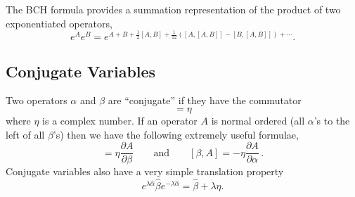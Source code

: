 The BCH formula provides a summation representation of the product of two exponentiated operators,
\begin{equation}
e^{A}e^{B}=e^{A+B+\frac{1}{2}[A,B]+\frac{1}{12}\left([A,[A,B]]-[B,[A,B]]\right)+\cdots}. \end{equation}

\subsection{Conjugate Variables}

Two operators $\alpha$ and $\beta$ are ``conjugate'' if they have the commutator
\begin{equation}
  [\alpha,\beta]=\eta
\end{equation}
where $\eta$ is a complex number.
If an operator $A$ is normal ordered (all $\alpha$'s to the left of all $\beta$'s) then we have the following extremely useful formulae,
\begin{equation}
  [\alpha,A] = \eta\frac{\partial A}{\partial\beta}
  \qquad\textrm{and}\qquad
  [\beta,A]=-\eta\frac{\partial A}{\partial\alpha}
  \, .
\end{equation}
Conjugate variables also have a very simple translation property
\begin{equation}
  e^{\lambda \hat{\alpha}}\hat{\beta}e^{-\lambda \hat{\alpha}}=\hat{\beta} + \lambda \eta.
\end{equation}
